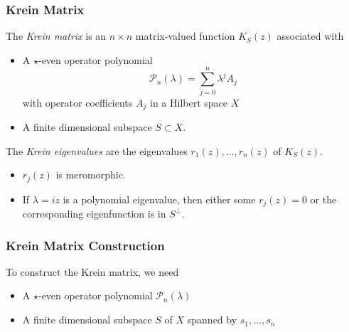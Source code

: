 \documentclass[16pt]{beamer}
\newcommand{\calP}{\mathcal{P}}
\begin{document}
\begin{frame}
\frametitle{Krein Matrix}
\begin{definition}[Kapitula et al., 2019]
    The \emph{Krein matrix} is an $n \times n$ matrix-valued function $K_S(z)$ associated with 
    \begin{itemize}
    	\item A $\star$-even operator polynomial 
    	\[
    	\calP_n(\lambda) = \sum_{j=0}^n \lambda^j A_j
    	\] 
    	with operator coefficients $A_j$ in a Hilbert space $X$
    	\item A finite dimensional subspace $S \subset X$.
    \end{itemize}

    The \emph{Krein eigenvalues} are the eigenvalues $r_1(z), \dots, r_n(z)$ of $K_S(z)$.
    \begin{itemize}
      \item $r_j(z)$ is meromorphic.
      \item If $\lambda = iz$ is a polynomial eigenvalue, then 
      either some $r_j(z) = 0$ or the corresponding eigenfunction is in $S^\perp$.
    \end{itemize}
\end{definition}
\end{frame}

\begin{frame}
\frametitle{Krein Matrix Construction}
	To construct the Krein matrix, we need
	\begin{itemize}
		\item A $\star$-even operator polynomial $\calP_n(\lambda)$
		\item A finite dimensional subspace $S$ of $X$ spanned by $s_1, \dots, s_n$
	\end{itemize}
\end{frame}
\end{document}
